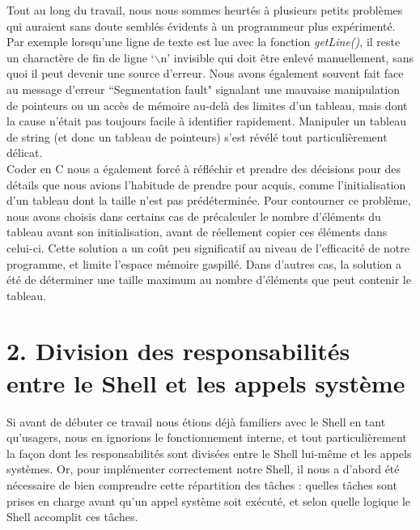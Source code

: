 \documentclass{article}
\begin{document}
\setlength{\parindent}{20pt}  
Tout au long du travail, nous nous sommes heurtés à plusieurs petits problèmes qui auraient sans doute semblés évidents à un programmeur plus expérimenté. Par exemple lorsqu’une ligne de texte est lue avec la fonction \emph{getLine()}, il reste un charactère de fin de ligne ‘$\backslash$n’ invisible qui doit être enlevé manuellement, sans quoi il peut devenir une source d’erreur.  Nous avons également souvent fait face au message d’erreur “Segmentation fault" signalant une mauvaise manipulation de pointeurs ou un accès de mémoire au-delà des limites d’un tableau, mais dont la cause n’était pas toujours facile à identifier rapidement. Manipuler un tableau de string (et donc un tableau de pointeurs) s’est révélé tout particulièrement délicat. 
\\

\setlength{\parindent}{20pt}
Coder en C nous a également forcé à réfléchir et prendre des décisions pour des détails que nous avions l’habitude de prendre pour acquis, comme l’initialisation d’un tableau dont la taille n’est pas prédéterminée. Pour contourner ce problème, nous avons choisis dans certains cas de précalculer le nombre d’éléments du tableau avant son initialisation, avant de réellement copier ces éléments dans celui-ci. Cette solution a un coût peu significatif au niveau de l’efficacité de notre programme, et limite l’espace mémoire gaspillé. Dans d’autres cas, la solution a été de déterminer une taille maximum au nombre d’éléments que peut contenir le tableau.

\section*{ 2. Division des responsabilités entre le Shell et les appels système }
\setlength{\parindent}{20pt}
Si avant de débuter ce travail nous étions déjà familiers avec le Shell en tant qu’usagers, nous en ignorions le fonctionnement interne, et tout particulièrement la façon dont les responsabilités sont divisées entre le Shell lui-même et les appels systèmes. Or, pour implémenter correctement notre Shell, il nous a d’abord été nécessaire de bien comprendre cette répartition des tâches : quelles tâches sont prises en charge avant qu’un appel système soit exécuté, et selon quelle logique le Shell accomplit ces tâches. 
\\
\end{document}
